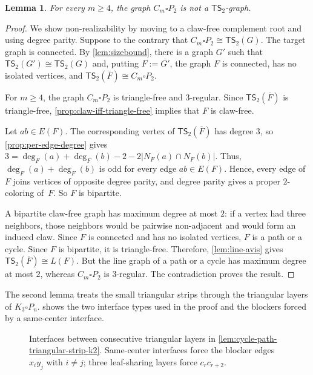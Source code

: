 \documentclass[a4paper]{article}
\theoremstyle{plain}
\newtheorem{lemma}[lemma]{Lemma}
\theoremstyle{definition}
\newcommand{\TSsym}{\mathsf{TS}}
\numberwithin{equation}{section}
\begin{document}
\begin{lemma}
\label{lem:cycle-path-prism-k2}
For every $m\ge 4$, the graph $C_m\square P_2$ is not a $\TSsym_2$-graph.
\end{lemma}

\begin{proof}
We show non-realizability by moving to a claw-free complement root and using degree parity.
Suppose to the contrary that $C_m\square P_2\cong \TSsym_2(G)$.
The target graph is connected. By \cref{lem:sizebound}, there is a graph $G'$ such that $\TSsym_2(G')\cong \TSsym_2(G)$ and, putting $F:=\overline{G'}$, the graph $F$ is connected, has no isolated vertices, and $\TSsym_2(\overline{F})\cong C_m\square P_2$.

For $m\ge 4$, the graph $C_m\square P_2$ is triangle-free and $3$-regular.
Since $\TSsym_2(\overline{F})$ is triangle-free, \cref{prop:claw-iff-triangle-free} implies that $F$ is claw-free.

Let $ab\in E(F)$.
The corresponding vertex of $\TSsym_2(\overline{F})$ has degree $3$, so \cref{prop:per-edge-degree} gives $3=\deg_F(a)+\deg_F(b)-2-2|N_F(a)\cap N_F(b)|$.
Thus, $\deg_F(a)+\deg_F(b)$ is odd for every edge $ab\in E(F)$.
Hence, every edge of $F$ joins vertices of opposite degree parity, and degree parity gives a proper $2$-coloring of~$F$.
So $F$ is bipartite.

A bipartite claw-free graph has maximum degree at most $2$: if a vertex had three neighbors, those neighbors would be pairwise non-adjacent and would form an induced claw.
Since $F$ is connected and has no isolated vertices, $F$ is a path or a cycle.
Since $F$ is bipartite, it is triangle-free.
Therefore, \cref{lem:line-avis} gives $\TSsym_2(\overline{F})\cong L(F)$.
But the line graph of a path or a cycle has maximum degree at most $2$, whereas $C_m\square P_2$ is $3$-regular.
The contradiction proves the result.
\end{proof}

The second lemma treats the small triangular strips through the triangular layers of $K_3\square P_n$.
 shows the two interface types used in the proof and the blockers forced by a same-center interface.

\begin{figure}[ht]
\centering

\caption{Interfaces between consecutive triangular layers in \cref{lem:cycle-path-triangular-strip-k2}. Same-center interfaces force the blocker edges $x_i y_j$ with $i\ne j$; three leaf-sharing layers force $c_r c_{r+2}$.}
\label{fig:triangular-strip-interfaces}
\end{figure}
\end{document}
